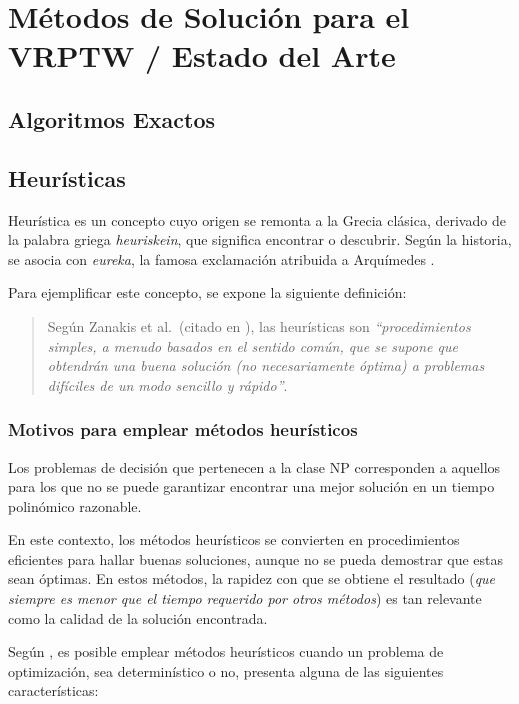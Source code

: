 \documentclass[12pt,titlepage,twoside,openright]{book}
\begin{document}
\section{Métodos de Solución para el VRPTW / Estado del Arte}
\subsection{Algoritmos Exactos}

\subsection{Heurísticas}

Heurística es un concepto cuyo origen se remonta a la Grecia clásica, derivado de la palabra griega \textit{heuriskein}, que significa encontrar o descubrir. Según la historia, se asocia con \textit{eureka}, la famosa exclamación atribuida a Arquímedes \citep{antonioSuarez2014}.

Para ejemplificar este concepto, se expone la siguiente definición:

\begin{quote}
	Según Zanakis et al.\ (citado en \citep{duarte2007metaheuristicas}), las heurísticas son \textit{``procedimientos simples, a menudo basados en el sentido común, que se supone que obtendrán una buena solución (no necesariamente óptima) a problemas difíciles de un modo sencillo y rápido''}.
\end{quote}

\subsubsection{Motivos para emplear métodos heurísticos}

Los problemas de decisión que pertenecen a la clase NP corresponden a aquellos para los que no se puede garantizar encontrar una mejor solución en un tiempo polinómico razonable.

En este contexto, los métodos heurísticos se convierten en procedimientos eficientes para hallar buenas soluciones, aunque no se pueda demostrar que estas sean óptimas. En estos métodos, la rapidez con que se obtiene el resultado (\textit{que siempre es menor que el tiempo requerido por otros métodos}) es tan relevante como la calidad de la solución encontrada.

Según \citep{antonioSuarez2014}, es posible emplear métodos heurísticos cuando un problema de optimización, sea determinístico o no, presenta alguna de las siguientes características:
\end{document}
